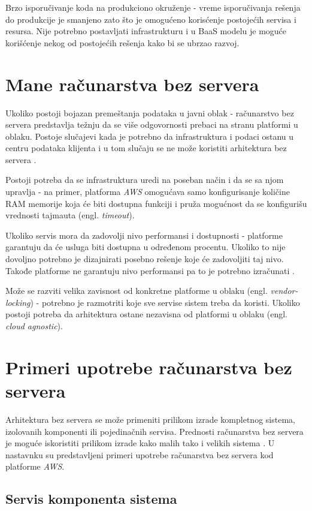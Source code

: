 \documentclass[12pt,oneside]{memoir}
\begin{document}
Brzo isporučivanje koda na produkciono okruženje - vreme isporučivanja rešenja do produkcije je smanjeno zato što je omogućeno korisćenje postojećih servisa i resursa. Nije potrebno postavljati infrastrukturu i u BaaS modelu je moguće korišćenje nekog od postojećih rešenja kako bi se ubrzao razvoj.

\section{Mane računarstva bez servera}

Ukoliko postoji bojazan premeštanja podataka u javni oblak - računarstvo bez servera predstavlja težnju da se više odgovornosti prebaci na stranu platformi u oblaku. Postoje slučajevi kada je potrebno da infrastruktura i podaci ostanu u centru podataka klijenta i u tom slučaju se ne može koristiti arhitektura bez servera \cite{sa}.


Postoji potreba da se infrastruktura uredi na poseban način i da se sa njom upravlja - na primer, platforma \emph{AWS} omogućava samo konfigurisanje količine RAM memorije koja će biti dostupna funkciji i pruža mogućnost da se konfigurišu vrednosti tajmauta (engl. \emph{timeout}).

Ukoliko servis mora da zadovolji nivo performansi i dostupnosti - platforme garantuju da će usluga biti dostupna u određenom procentu. Ukoliko to nije dovoljno potrebno je dizajnirati posebno rešenje koje će zadovoljiti taj nivo. Takođe platforme ne garantuju nivo performansi pa to je potrebno izračunati \cite{sa}.

Može se razviti velika zavisnost od konkretne platforme u oblaku (engl. \emph{vendor-locking}) - potrebno je razmotriti koje sve servise sistem treba da koristi. Ukoliko postoji potreba da arhitektura ostane nezavisna od platformi u oblaku (engl. \emph{cloud agnostic}).


\section{Primeri upotrebe računarstva bez servera}

Arhitektura bez servera se može primeniti prilikom izrade kompletnog sistema, izolovanih komponenti ili pojedinačnih servisa. Prednosti računarstva bez servera je moguće iskoristiti prilikom izrade kako malih tako i velikih sistema \cite{sa}. U nastavnku su predstavljeni primeri upotrebe računarstva bez servera kod platforme \emph{AWS}.

\subsection{Servis komponenta sistema}
\end{document}
